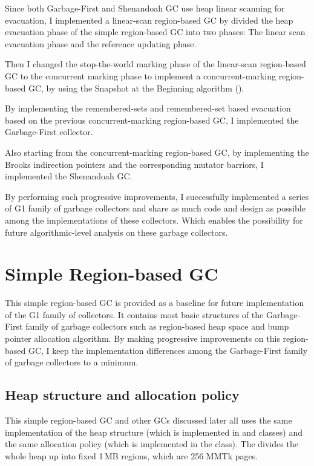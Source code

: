 Since both Garbage-First and Shenandoah GC use heap linear scanning for evacuation,
I implemented a linear-scan region-based GC by divided the heap evacuation phase
of the simple region-based GC into two phases: The linear scan evacuation phase
and the reference updating phase.

Then I changed the stop-the-world marking phase of the linear-scan region-based GC
to the concurrent marking phase to implement a concurrent-marking region-based GC, 
by using the Snapshot at the Beginning algorithm (\cite{yuasa1990real}).

By implementing the remembered-sets and remembered-set based evacuation based on
the previous concurrent-marking region-based GC, I implemented the Garbage-First collector.

Also starting from the concurrent-marking region-based GC, by implementing the Brooks indirection pointers
and the corresponding mutator barriors, I implemented the Shenandoah GC.

By performing such progressive improvements, I successfully implemented a series of
G1 family of garbage collectors and share as much code and design as possible
among the implementations of these collectors. Which enables the possibility for future
algorithmic-level analysis on these garbage collectors.

\section{Simple Region-based GC}
\label{sec:simpleregiongc}

This simple region-based GC is provided as a baseline for future implementation of the G1 family of collectors.
It contains most basic structures of the Garbage-First family of garbage collectors such as
region-based heap space and bump pointer allocation algorithm. By making progressive improvements
on this region-based GC, I keep the implementation differences among the
Garbage-First family of garbage collectors to a minimum.

\subsection{Heap structure and allocation policy}

This simple region-based GC and other GCs discussed later all uses the same implementation of the
heap structure (which is implemented in  and  classes) and the
same allocation policy (which is implemented in the  class).
The  divides the whole heap up into fixed 1\,MB regions, which
are 256 MMTk pages.

